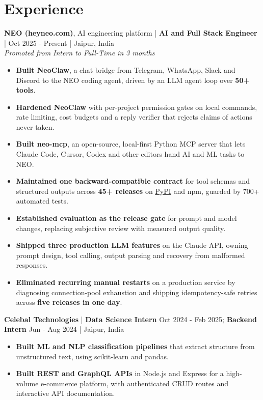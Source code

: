\documentclass[10pt,letterpaper]{article}
\newcommand{\entrygap}{\vspace{3pt}}
\begin{document}
\section*{Experience}

\textbf{NEO (heyneo.com)}, AI engineering platform | \textbf{AI and Full Stack Engineer} |
Oct 2025 - Present | Jaipur, India\\
\textit{Promoted from Intern to Full-Time in 3 months}
\begin{itemize}
  \item \textbf{Built NeoClaw}, a chat bridge from Telegram, WhatsApp, Slack and Discord to the NEO coding agent, driven by an LLM agent loop over \textbf{50+ tools}.
  \item \textbf{Hardened NeoClaw} with per-project permission gates on local commands, rate limiting, cost budgets and a reply verifier that rejects claims of actions never taken.
  \item \textbf{Built neo-mcp}, an open-source, local-first Python MCP server that lets Claude Code, Cursor, Codex and other editors hand AI and ML tasks to NEO.
  \item \textbf{Maintained one backward-compatible contract} for tool schemas and structured outputs across \textbf{45+ releases} on \href{https://pypi.org/project/neo-mcp/}{PyPI} and npm, guarded by 700+ automated tests.
  \item \textbf{Established evaluation as the release gate} for prompt and model changes, replacing subjective review with measured output quality.
  \item \textbf{Shipped three production LLM features} on the Claude API, owning prompt design, tool calling, output parsing and recovery from malformed responses.
  \item \textbf{Eliminated recurring manual restarts} on a production service by diagnosing connection-pool exhaustion and shipping idempotency-safe retries across \textbf{five releases in one day}.
\end{itemize}

\entrygap
\textbf{Celebal Technologies} | \textbf{Data Science Intern} Oct 2024 - Feb 2025;
\textbf{Backend Intern} Jun - Aug 2024 | Jaipur, India
\begin{itemize}
  \item \textbf{Built ML and NLP classification pipelines} that extract structure from unstructured text, using scikit-learn and pandas.
  \item \textbf{Built REST and GraphQL APIs} in Node.js and Express for a \mbox{high-volume} e-commerce platform, with authenticated CRUD routes and interactive API documentation.
\end{itemize}
\end{document}
